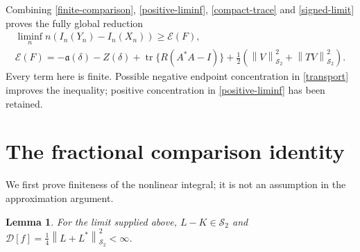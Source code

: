 \documentclass[a4paper,11pt]{amsart}
\newtheorem{lemma}[theorem]{Lemma}
\theoremstyle{remark}\newtheorem{remark}[theorem]{Remark}
\newcommand{\tr}{\operatorname{tr}}
\newcommand{\HS}{\mathcal S_2}
\newcommand{\norm}[1]{\left\lVert#1\right\rVert}
\begin{document}
Combining \eqref{finite-comparison}, \eqref{positive-liminf},
\eqref{compact-trace} and \eqref{signed-limit} proves the fully
global reduction
\begin{equation}\label{global-reduction}
 \begin{gathered}
 \liminf_n n(I_n(Y_n)-I_n(X_n))\ge\mathcal E(F),\qquad
 \\
 \mathcal E(F)=-\mathfrak a(\delta)-Z(\delta)
 +\tr\{R(A^*A-I)\}
 +\tfrac12(\norm V_{\HS}^2+\norm{TV}_{\HS}^2).
 \end{gathered}
\end{equation}
Every term here is finite. Possible negative endpoint concentration
in \eqref{transport} improves the inequality; positive concentration
in \eqref{positive-liminf} has been retained.

\section{The fractional comparison identity}

We first prove finiteness of the nonlinear integral; it is not an
assumption in the approximation argument.

\begin{lemma}\label{finite-defect}
For the limit supplied above, $L-K\in\HS$ and
$\mathcal D[f]=\tfrac14\norm{L+L^*}_{\HS}^2<\infty$.
\end{lemma}
\end{document}
